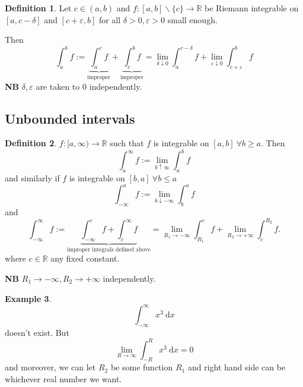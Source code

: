 \documentclass[a4paper]{article}
\theoremstyle{definition}
\newtheorem{defn}{Definition}[subsection]
\newtheorem{example}[defn]{Example}
\begin{document}
\begin{defn}
Let $c\in (a,b)$ and $f:[a,b]\backslash\{c\} \rightarrow \mathbb R$ be Riemann integrable on $[a,c-\delta]$ and $[c+\varepsilon ,b]$ for all $\delta>0,\varepsilon>0$ small enough.
\begin{center}
\end{center}
Then
\[
\int_a^b f := \underbrace{\int_a^c f}_{\text{improper}} + \underbrace{\int_c^b f}_{\text{improper}} = \lim_{\delta \downarrow 0}\int_a^{c-\delta} f+\lim_{\varepsilon \downarrow 0}\int_{c+\varepsilon}^{b} f
\]
\textbf{NB} $\delta,\varepsilon$ are taken to $0$ independently.
\end{defn}
\subsection{Unbounded intervals}
\begin{defn}
$f:[a,\infty) \rightarrow \mathbb R$ such that $f$ is integrable on $[a,b] \ \forall b\geq a$. Then
\[
\int_a^\infty f := \lim_{b\uparrow \infty} \int_a^b f
\]
and similarly if $f$ is integrable on $[b,a] \ \forall b\leq a$
\[
\int_{-\infty}^a f := \lim_{b\downarrow -\infty} \int_b^a f
\]
and
\[
\int_{-\infty}^\infty f:= \underbrace{\int_{-\infty}^c f + \int_c^{\infty} f}_{\text{improper integrals defined above}}=\lim_{R_1 \rightarrow -\infty} \int_{R_1}^c f + \lim_{R_2 \rightarrow +\infty} \int_c^{R_2} f .
\]
where $c\in \mathbb R$ any fixed constant.

\textbf{NB} $R_1\rightarrow -\infty, R_2\rightarrow +\infty$ independently.
\end{defn}
\begin{example}
\[
\int_{-\infty}^\infty x^3 \ \mathrm d x
\]
doesn't exist. But
\[
\lim_{R\rightarrow \infty} \int_{-R}^R x^3 \ \mathrm d x=0
\]
and moreover, we can let $R_2$ be some function $R_1$ and right hand side can be whichever real number we want.
\end{example}
\end{document}
